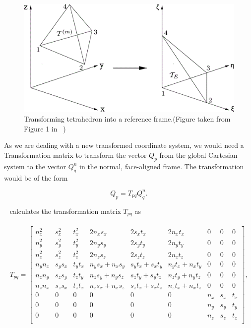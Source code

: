 \begin{figure}
    \centering
    \includegraphics[width=0.6\linewidth]{figures/m_167-1-319-fig001.png}
    \caption{Transforming tetrahedron into a reference frame.(Figure taken from Figure 1 in ~\parencite{dumbser1})}
    \label{fig:transformation}
\end{figure}

As we are dealing with a new transformed coordinate system, we would need a Transformation matrix to transform the vector $Q_p$
from the global Cartesian system to the vector $Q_q^n$ in the normal, face-aligned frame. The transformation would be of the form

\begin{equation}
    Q_p = T_{pq}Q_q^n .
\end{equation}

~\parencite{dumbser1} calculates the transformation matrix $T_{pq}$ as

\begin{align}
    \begin{split}
    T_{pq} = 
        \begin{bmatrix}
        n_x^2 & s_x^2 & t_x^2 & 2n_x s_x & 2s_x t_x & 2n_x t_x & 0 & 0 & 0 \\
        n_y^2 & s_y^2 & t_y^2 & 2n_y s_y & 2s_y t_y & 2n_y t_y & 0 & 0 & 0 \\
        n_z^2 & s_z^2 & t_z^2 & 2n_z s_z & 2s_z t_z & 2n_z t_z & 0 & 0 & 0 \\
        n_y n_x & s_y s_x & t_y t_x & n_y s_x + n_x s_y & s_y t_x + s_x t_y & n_y t_x + n_x t_y & 0 & 0 & 0 \\
        n_z n_y & s_z s_y & t_z t_y & n_z s_y + n_y s_z & s_z t_y + s_y t_z & n_z t_y + n_y t_z & 0 & 0 & 0 \\
        n_z n_x & s_z s_x & t_z t_x & n_z s_x + n_x s_z & s_z t_x + s_x t_z & n_z t_x + n_x t_z & 0 & 0 & 0 \\
        0 & 0 & 0 & 0 & 0 & 0 & n_x & s_x & t_x \\
        0 & 0 & 0 & 0 & 0 & 0 & n_y & s_y & t_y \\
        0 & 0 & 0 & 0 & 0 & 0 & n_z & s_z & t_z \\
    \end{bmatrix},
    \end{split}
\end{align}

